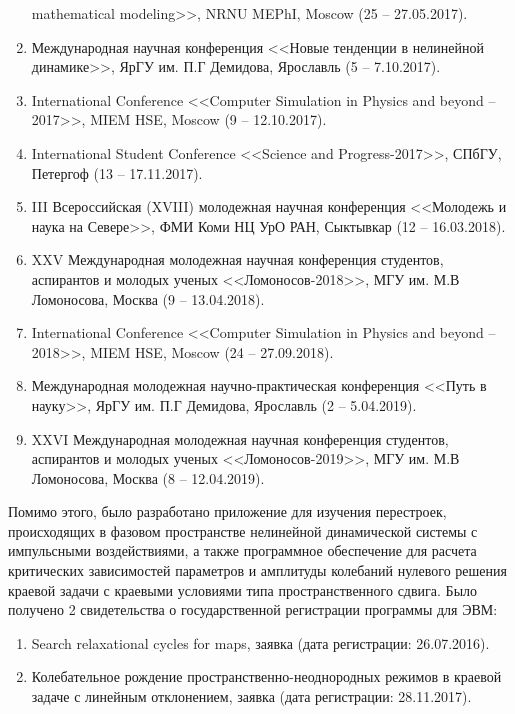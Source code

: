 \documentclass[12pt]{extarticle}
\begin{document}
\begin{enumerate}[label=\arabic*),leftmargin=1.5\parindent]
\vspace{-0.2cm}
mathematical modeling>>, NRNU MEPhI, Moscow (25 -- 27.05.2017).
\item Международная научная конференция <<Новые тенденции в нелинейной динамике>>, ЯрГУ им. П.Г Демидова, Ярославль (5 -- 7.10.2017).
\item International Conference <<Computer Simulation in Physics and beyond -- 2017>>, MIEM HSE, Moscow (9 -- 12.10.2017).
\item International Student Conference <<Science and Progress-2017>>, СПбГУ, Петергоф (13 -- 17.11.2017).
\item III Всероссийская (XVIII) молодежная научная конференция <<Молодежь и наука на Севере>>, ФМИ Коми НЦ УрО РАН, Сыктывкар (12 -- 16.03.2018).
\item XXV Международная молодежная научная конференция студентов, аспирантов и молодых ученых <<Ломоносов-2018>>, МГУ им. М.В Ломоносова, Москва (9 -- 13.04.2018).
\item International Conference <<Computer Simulation in Physics and beyond -- 2018>>, MIEM HSE, Moscow (24 -- 27.09.2018).
\item Международная молодежная научно-практическая конференция <<Путь в науку>>, ЯрГУ им. П.Г Демидова, Ярославль (2 -- 5.04.2019).
\item XXVI Международная молодежная научная конференция студентов, аспирантов и молодых ученых <<Ломоносов-2019>>, МГУ им. М.В Ломоносова, Москва (8 -- 12.04.2019).
\end{enumerate}

Помимо этого, было разработано приложение для изучения перестроек, происходящих в фазовом пространстве нелинейной динамической системы с импульсными воздействиями, а также программное обеспечение для расчета критических зависимостей параметров и амплитуды колебаний нулевого решения краевой задачи с краевыми условиями типа пространственного сдвига. Было получено 2 свидетельства о государственной регистрации программы для ЭВМ:

\begin{enumerate}[label=\arabic*),leftmargin=1.5\parindent]
\item Search relaxational cycles for maps, заявка  (дата регистрации: 26.07.2016).
\item Колебательное рождение пространственно-неоднородных режимов в краевой задаче с линейным отклонением, заявка  (дата регистрации: 28.11.2017).
\end{enumerate}
\end{document}
